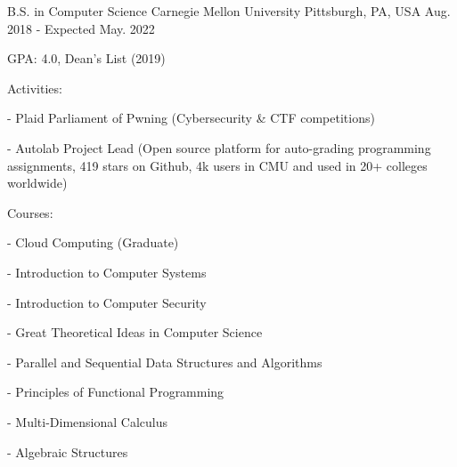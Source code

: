 

\begin{cventries}

  \cventry
    {B.S. in Computer Science} %
    {Carnegie Mellon University} %
    {Pittsburgh, PA, USA} %
    {Aug. 2018 - Expected May. 2022} %
    {
      \begin{cvitems} %
      \item {GPA: 4.0, Dean's List (2019)}
      \item {Activities:}
          \item[-] {Plaid Parliament of Pwning (Cybersecurity \& CTF competitions)}
          \item[-] {Autolab Project Lead (Open source platform for auto-grading programming assignments, 419 stars on Github, 4k users in CMU and used in 20+ colleges worldwide)}
      \item {Courses:}
        \setlength\multicolsep{0pt}
        \begin{multicols}{3}
          \item[-] {Cloud Computing (Graduate)}
          \item[-] {Introduction to Computer Systems}
          \item[-] {Introduction to Computer Security}
          \item[-] {Great Theoretical Ideas in Computer Science}
          \item[-] {Parallel and Sequential Data Structures and Algorithms}
          \item[-] {Principles of Functional Programming}
          \item[-] {Multi-Dimensional Calculus}
          \item[-] {Algebraic Structures}
        \end{multicols}
      \end{cvitems}
    }
\end{cventries}
